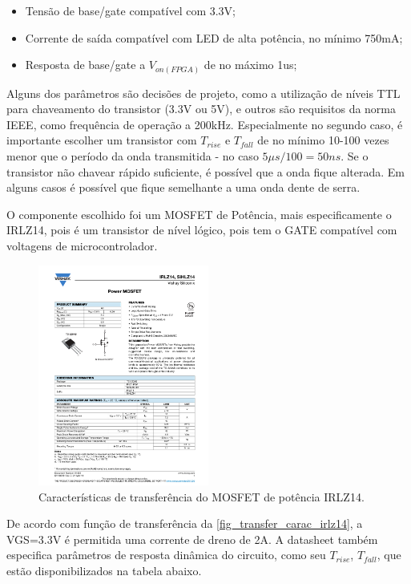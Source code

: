 	\begin{itemize}
		\item Tensão de base/gate compatível com 3.3V;
		\item Corrente de saída compatível com LED de alta potência, no mínimo 750mA;
		\item Resposta de base/gate a $V_{on(FPGA)}$ de no máximo 1us;
	\end{itemize}
	
	Alguns dos parâmetros são decisões de projeto, como a utilização de níveis TTL para chaveamento do transistor (3.3V ou 5V), e outros são requisitos da norma IEEE, como frequência de operação a 200kHz. Especialmente no segundo caso, é importante escolher um transistor com $T_{rise}$ e $T_{fall}$ de no mínimo 10-100 vezes menor que o período da onda transmitida - no caso $5\mu$$s/100 = 50ns$. Se o transistor não chavear rápido suficiente, é possível que a onda fique alterada. Em alguns casos é possível que fique semelhante a uma onda dente de serra.
	
	O componente escolhido foi um MOSFET de Potência, mais especificamente o IRLZ14, pois é um transistor de nível lógico, pois tem o GATE compatível com voltagens de microcontrolador. 
	
	\begin{figure}[htb]
		\caption{\label{fig_transfer_carac_irlz14} Características de transferência do MOSFET de potência IRLZ14.}
		\centering		%
		\includegraphics[page=3, width=0.5\textwidth, trim={12cm 16.5cm 2.2cm 5cm}, clip]{circuits/irlz14.pdf}
	\end{figure}

	De acordo com função de transferência da \autoref{fig_transfer_carac_irlz14}, a VGS=3.3V é permitida uma corrente de dreno de 2A. A datasheet também especifica parâmetros de resposta dinâmica do circuito, como seu $T_{rise}$, $T_{fall}$, que estão disponibilizados na tabela abaixo.
	
